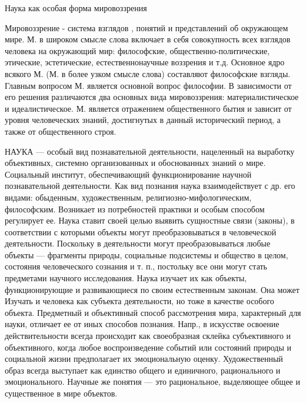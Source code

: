 \documentclass[a4paper,12pt]{article}
\begin{document}
Наука как особая форма мировоззрения 

Мировоззрение - система взглядов , понятий и представлений об окружающем мире. М. в широком смысле слова включает в себя совокупность всех взглядов человека на окружающий мир: философские, общественно-политические, этические, эстетические, естественнонаучные воззрения и т.д. Основное ядро всякого М. (М. в более узком смысле слова) составляют философские взгляды. Главным вопросом М. является основной вопрос философии. В зависимости от его решения различаются два основных вида мировоззрения: материалистическое и идеалистическое. М. является отражением общественного бытия и зависит от уровня человеческих знаний, достигнутых в данный исторический период, а также от общественного строя.

НАУКА — особый вид познавательной деятельности, нацеленный на выработку объективных, системно организованных и обоснованных знаний о мире. Социальный институт, обеспечивающий функционирование научной познавательной деятельности.
    Как вид познания наука взаимодействует с др. его видами: обыденным, художественным, религиозно-мифологическим, философским. Возникает из потребностей практики и особым способом регулирует ее. Наука ставит своей целью выявить сущностные связи (законы), в соответствии с которыми объекты могут преобразовываться в человеческой деятельности. Поскольку в деятельности могут преобразовываться любые объекты — фрагменты природы, социальные подсистемы и общество в целом, состояния человеческого сознания и т. п., постольку все они могут стать предметами научного исследования. Наука изучает их как объекты, функционирующие и развивающиеся по своим естественным законам. Она может Изучать и человека как субъекта деятельности, но тоже в качестве особого объекта.
    Предметный и объективный способ рассмотрения мира, характерный для науки, отличает ее от иных способов познания. Напр., в искусстве освоение действительности всегда происходит как своеобразная склейка субъективного и объективного, когда любое воспроизведение событий или состояний природы и социальной жизни предполагает их эмоциональную оценку. Художественный образ всегда выступает как единство общего и единичного, рационального и эмоционального. Научные же понятия — это рациональное, выделяющее общее и существенное в мире объектов.
\end{document}
